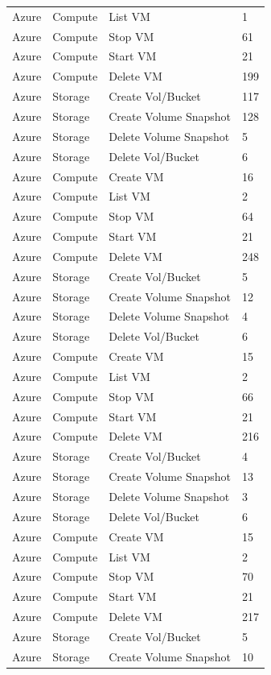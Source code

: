 \begin{table}[htb]
\begin{tabular} {p{3cm}|p{3cm}|p{5cm}|p{3cm}}
Azure & Compute & List VM & 1  \\
Azure & Compute & Stop VM & 61  \\
Azure & Compute & Start VM & 21  \\
Azure & Compute & Delete VM & 199  \\
Azure & Storage & Create Vol/Bucket & 117  \\
Azure & Storage & Create Volume Snapshot & 128  \\
Azure & Storage & Delete Volume Snapshot & 5  \\
Azure & Storage & Delete Vol/Bucket & 6  \\
Azure & Compute & Create VM & 16  \\
Azure & Compute & List VM & 2  \\
Azure & Compute & Stop VM & 64  \\
Azure & Compute & Start VM & 21  \\
Azure & Compute & Delete VM & 248  \\
Azure & Storage & Create Vol/Bucket & 5  \\
Azure & Storage & Create Volume Snapshot & 12  \\
Azure & Storage & Delete Volume Snapshot & 4  \\
Azure & Storage & Delete Vol/Bucket & 6  \\
Azure & Compute & Create VM & 15  \\
Azure & Compute & List VM & 2  \\
Azure & Compute & Stop VM & 66  \\
Azure & Compute & Start VM & 21  \\
Azure & Compute & Delete VM & 216  \\
Azure & Storage & Create Vol/Bucket & 4  \\
Azure & Storage & Create Volume Snapshot & 13  \\
Azure & Storage & Delete Volume Snapshot & 3  \\
Azure & Storage & Delete Vol/Bucket & 6  \\
Azure & Compute & Create VM & 15  \\
Azure & Compute & List VM & 2  \\
Azure & Compute & Stop VM & 70  \\
Azure & Compute & Start VM & 21  \\
Azure & Compute & Delete VM & 217  \\
Azure & Storage & Create Vol/Bucket & 5  \\
Azure & Storage & Create Volume Snapshot & 10  \\

\end{tabular}
\end{table}
